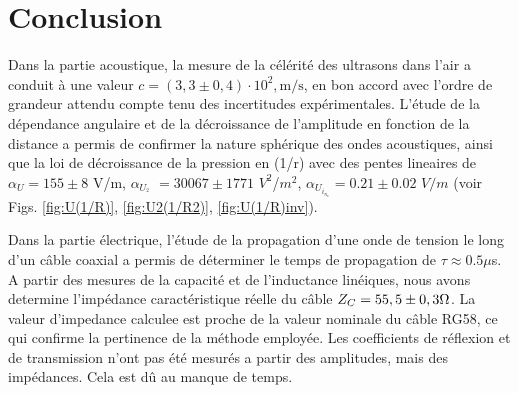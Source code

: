 \section{Conclusion}

Dans la partie acoustique, la mesure de la célérité des ultrasons dans l’air a conduit à une valeur $c = (3,3 \pm 0,4)\cdot 10^2,\mathrm{m/s}$, en bon accord avec l’ordre de grandeur attendu compte tenu des incertitudes expérimentales. L’étude de la dépendance angulaire et de la décroissance de l’amplitude en fonction de la distance a permis de confirmer la nature sphérique des ondes acoustiques, ainsi que la loi de décroissance de la pression en (1/r) avec des pentes lineaires de $\alpha_U = 155 \pm 8$ V/m, $\alpha_U_^2$ $= 30067 \pm 1771$ $V^2$/$m^2$, $\alpha_U_i_n_v = 0.21 \pm 0.02$ $V/m$ (voir Figs. \ref{fig:U(1/R)}, \ref{fig:U2(1/R2)}, \ref{fig:U(1/R)inv}).

Dans la partie électrique, l’étude de la propagation d’une onde de tension le long d’un câble coaxial a permis de déterminer le temps de propagation de $\tau \approx 0.5 \mu$s. A partir des mesures de la capacité et de l’inductance linéiques, nous avons determine l’impédance caractéristique réelle du câble  $Z_C = 55,5 \pm 0,3 \ohm$. La valeur d'impedance calculee est proche de la valeur nominale du câble RG58, ce qui confirme la pertinence de la méthode employée. Les coefficients de réflexion et de transmission n'ont pas été mesurés a partir des amplitudes, mais des impédances. Cela est dû au manque de temps.



